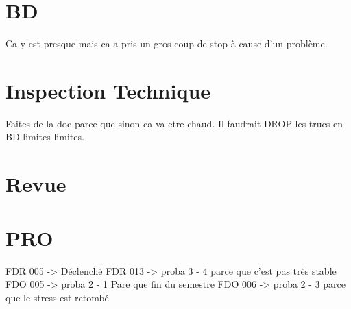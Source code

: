 \documentclass [a4paper] {article}
\begin{document}
\section{BD}
Ca y est presque mais ca a pris un gros coup de stop à cause d'un problème.


\section{Inspection Technique}
Faites de la doc parce que sinon ca va etre chaud. Il faudrait DROP les trucs en BD limites limites.


\section{Revue}

\section{PRO}
FDR 005 -> Déclenché
FDR 013 -> proba 3 - 4 parce que c'est pas très stable
FDO 005 -> proba 2 - 1 Pare que fin du semestre
FDO 006 -> proba 2 - 3 parce que le stress est retombé


\end{document}
